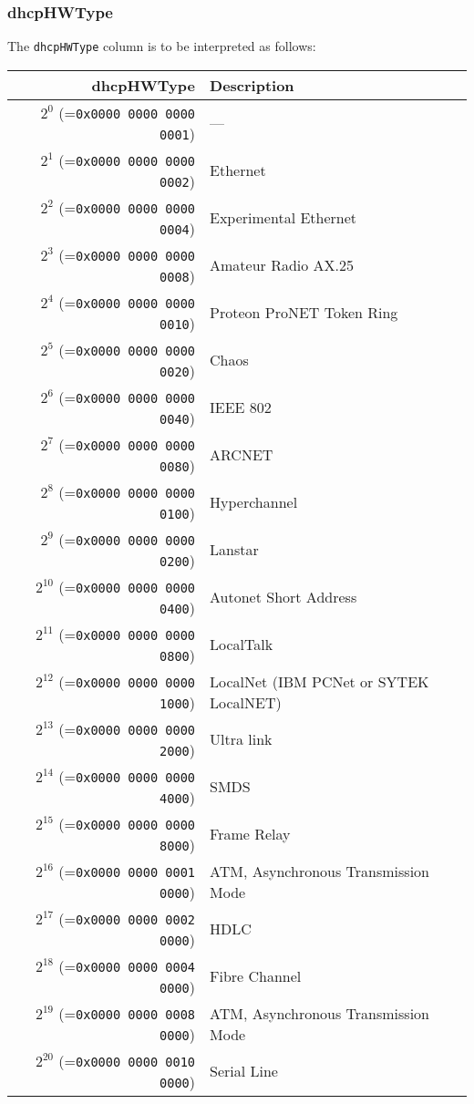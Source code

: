 \documentclass[documentation]{subfiles}
\begin{document}
\subsubsection{dhcpHWType}\label{dhcpHWType}
The {\tt dhcpHWType} column is to be interpreted as follows:
\begin{longtable}{rl}
    \toprule
    {\bf dhcpHWType} & {\bf Description}\\
    \midrule\endhead%
    $2^{0}$  (={\tt 0x0000 0000 0000 0001}) & --- \\
    $2^{1}$  (={\tt 0x0000 0000 0000 0002}) & Ethernet \\
    $2^{2}$  (={\tt 0x0000 0000 0000 0004}) & Experimental Ethernet \\
    $2^{3}$  (={\tt 0x0000 0000 0000 0008}) & Amateur Radio AX.25 \\
    $2^{4}$  (={\tt 0x0000 0000 0000 0010}) & Proteon ProNET Token Ring \\
    $2^{5}$  (={\tt 0x0000 0000 0000 0020}) & Chaos \\
    $2^{6}$  (={\tt 0x0000 0000 0000 0040}) & IEEE 802 \\
    $2^{7}$  (={\tt 0x0000 0000 0000 0080}) & ARCNET \\
    $2^{8}$  (={\tt 0x0000 0000 0000 0100}) & Hyperchannel \\
    $2^{9}$  (={\tt 0x0000 0000 0000 0200}) & Lanstar \\
    $2^{10}$ (={\tt 0x0000 0000 0000 0400}) & Autonet Short Address \\
    $2^{11}$ (={\tt 0x0000 0000 0000 0800}) & LocalTalk \\
    $2^{12}$ (={\tt 0x0000 0000 0000 1000}) & LocalNet (IBM PCNet or SYTEK LocalNET) \\
    $2^{13}$ (={\tt 0x0000 0000 0000 2000}) & Ultra link \\
    $2^{14}$ (={\tt 0x0000 0000 0000 4000}) & SMDS \\
    $2^{15}$ (={\tt 0x0000 0000 0000 8000}) & Frame Relay \\
    $2^{16}$ (={\tt 0x0000 0000 0001 0000}) & ATM, Asynchronous Transmission Mode \\
    $2^{17}$ (={\tt 0x0000 0000 0002 0000}) & HDLC \\
    $2^{18}$ (={\tt 0x0000 0000 0004 0000}) & Fibre Channel \\
    $2^{19}$ (={\tt 0x0000 0000 0008 0000}) & ATM, Asynchronous Transmission Mode \\
    $2^{20}$ (={\tt 0x0000 0000 0010 0000}) & Serial Line \\

\end{longtable}
\end{document}

